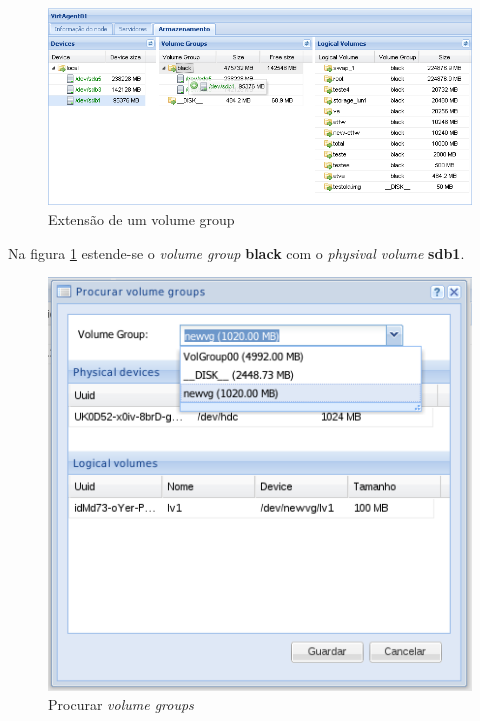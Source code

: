 \begin{figure}[H]
        \begin{center}
        \includegraphics[scale=0.45]{screenshots/storage_vg_extend.png}
        \caption{Extensão de um volume group}
        \label{fig:storage_vg_extend}
        \end{center}
\end{figure}

Na figura \ref{fig:storage_vg_extend} estende-se o \emph{volume group} {\bf black} com o \emph{physival volume} {\bf sdb1}.

\begin{figure}[H]
        \begin{center}
        \includegraphics[scale=0.45]{screenshots/node_storage_vg_search.png}
        \caption{Procurar \emph{volume groups}}
        \label{fig:storage_vg_search}
        \end{center}
\end{figure}

